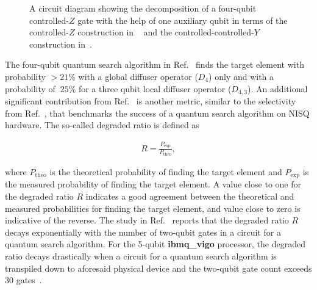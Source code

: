 \clearpage
\begin{figure}[t!]
    \centering
    \caption[A circuit diagram showing the decomposition of a four-qubit controlled-$Z$ gate with the help of one auxiliary qubit in terms of the controlled-$Z$ and a controlled-controlled-$Y$ gate.]{A circuit diagram showing the decomposition of a four-qubit controlled-$Z$ gate with the help of one auxiliary qubit in terms of the controlled-$Z$ construction in ~\protect{} and the controlled-controlled-$Y$ construction in~\protect{}.}
\end{figure}

\noindent
The four-qubit quantum search algorithm in Ref.~\cite{Gwinner_2020} finds the target element with probability $>21\%$ with a global diffuser operator (\ie $D_{4}$) only and with a probability of $~25\%$ for a three qubit local diffuser operator (\ie $D_{4,3}$). An additional significant contribution from Ref.~\cite{Gwinner_2020} is another metric, similar to the selectivity from Ref.~\cite{Wang_2020}, that benchmarks the success of a quantum search algorithm on \acs{NISQ} hardware. The so-called degraded ratio is defined as

\begin{align}
	R = \frac{P_\text{exp}}{P_\text{theo}},
\end{align}

\noindent
where $P_\text{theo}$ is the theoretical probability of finding the target element and $P_\text{exp}$ is the measured probability of finding the target element. A value close to one for the degraded ratio $R$ indicates a good agreement between the theoretical and measured probabilities for finding the target element, and value close to zero is indicative of the reverse. The study in Ref.~\cite{Gwinner_2020} reports that the degraded ratio $R$ decays exponentially with the number of two-qubit gates in a circuit for a quantum search algorithm. For the 5-qubit \textbf{ibmq\_vigo} processor, the degraded ratio decays drastically when a circuit for a quantum search algorithm is transpiled down to aforesaid physical device and the two-qubit gate count exceeds $30$ gates~\cite{Gwinner_2020}.

